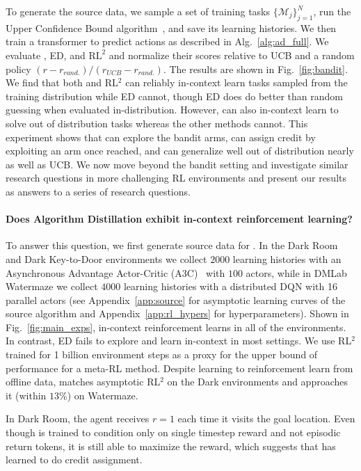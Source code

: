 To generate the source data, we sample a set of training tasks $\{ \mathcal M_j\}_{j=1}^N$, run the Upper Confidence Bound algorithm~\citep{lai86ucb}, and save its learning histories. We then train a transformer to predict actions as described in Alg.~\ref{alg:ad_full}. We evaluate \namenospace, ED, and $\text{RL}^2$ and normalize their scores relative to UCB and a random policy ${(r - r_{rand.})}/{ (r_{UCB} - r_{rand.})}$. The results are shown in Fig.~\ref{fig:bandit}. We find that both \name and RL$^2$ can reliably in-context learn tasks sampled from the training distribution while ED cannot, though ED does do better than random guessing when evaluated in-distribution. However, \name can also in-context learn to solve out of distribution tasks whereas the other methods cannot. This experiment shows that \name can explore the bandit arms, can assign credit by exploiting an arm once reached, and can generalize well out of distribution nearly as well as UCB. We now move beyond the bandit setting and investigate similar research questions in more challenging RL environments and present our results as answers to a series of research questions. 


\vspace{-2mm}
\paragraph{Does Algorithm Distillation exhibit in-context reinforcement learning?}

To answer this question, we first generate source data for \fullnamenospace.
In the Dark Room and Dark Key-to-Door environments we collect $2000$ learning histories with an Asynchronous Advantage Actor-Critic (A3C)~\citep{mnih16a3c} with $100$ actors, while in DMLab Watermaze we collect $4000$ learning histories with a distributed DQN with 16 parallel actors (see Appendix~\ref{app:source} for asymptotic learning curves of the source algorithm and Appendix~\ref{app:rl_hypers} for hyperparameters). Shown in Fig.~\ref{fig:main_exps}, \name in-context reinforcement learns in all of the environments. In contrast, ED fails to explore and learn in-context in most settings. We use RL$^2$ trained for 1 billion environment steps as a proxy for the upper bound of performance for a meta-RL method. Despite learning to reinforcement learn from offline data, \name matches asymptotic RL$^2$ on the Dark environments and approaches it (within $13\%$) on Watermaze.

 In Dark Room, the agent receives $r=1$ each time it visits the goal location. Even though \name is trained to condition only on single timestep reward and not episodic return tokens, it is still able to maximize the reward, which suggests that \name has learned to do credit assignment.

